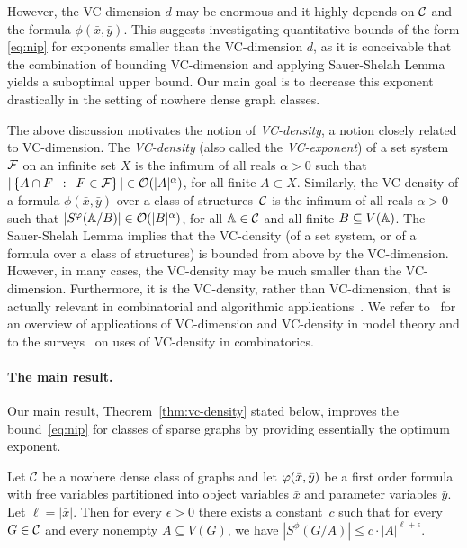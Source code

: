 However, the VC-dimension $d$ may be enormous and it highly depends on $\cal C$ and the formula $\phi(\bar x,\bar y)$.
This suggests investigating quantitative bounds of the form \eqref{eq:nip} for exponents smaller than the VC-dimension $d$, as it is conceivable that the combination of bounding VC-dimension and applying
Sauer-Shelah Lemma yields a suboptimal upper bound. Our main goal is to decrease this exponent drastically in the setting of nowhere dense graph classes.

The above discussion motivates the notion of \emph{VC-density}, a notion closely related to VC-dimension.
The \emph{VC-density} (also called the 
\emph{VC-exponent})
of a set system $\cal F$
on an infinite set $X$ is the infimum of all reals $\alpha>0$ such that 
$|\setof{A\cap F}{F\in \cal F}|\in \Oof(|A|^\alpha)$, for all finite $A\subset X$. 
Similarly, the VC-density of a formula $\phi(\bar x,\bar y)$ over a class of structures~$\cal C$
is the infimum of all reals $\alpha>0$
such that $|S^\phi(\str A/B)|\in \Oof(|B|^\alpha)$,
for all $\str A\in \cal C$ and all finite $B\subset V(\str A)$.
The Sauer-Shelah Lemma
implies that the VC-density (of a set system, or of a formula over a class of structures) is bounded from above by the VC-dimension. 
However, in many cases, the VC-density may be much smaller than the VC-dimension. Furthermore, it is the VC-density, rather than VC-dimension, that is actually relevant in combinatorial
and algorithmic applications~\cite{Bronnimann1995,matouvsek1998geometric,Matousek:2004:BVI:1005787.1005789}. %
We refer to~\cite{aschenbrenner2016vapnik} for an overview of 
applications of VC-dimension and VC-density in model
theory and to the surveys~\cite{furedi1991traces,matouvsek1998geometric} 
on uses of VC-density in
combinatorics. 

\paragraph{The main result.}
Our main result, Theorem~\ref{thm:vc-density} stated below, improves the bound~\eqref{eq:nip} for classes of sparse graphs
by providing essentially the optimum exponent.

 \begin{theorem}\label{thm:vc-density}
Let $\CCC$ be a nowhere dense class of graphs and let $\phi(\tup x,\tup y)$ be a first order formula
with free variables  partitioned  into object variables $\bar x$  and parameter variables $\bar y$. Let $\ell=|\bar x|$. Then 
for every $\epsilon>0$ 
there exists a constant~$c$ such that for every $G\in \CCC$ and every nonempty
$A\subseteq V(G)$, we have $|S^\phi(G/A)|\leq c\cdot |A|^{\ell+\epsilon}.$
 \end{theorem}

